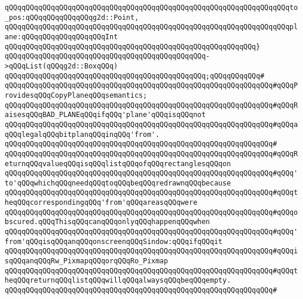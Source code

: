 \verb|qQQqqQQqqQQqqQQqqQQqqQQqqQQqqQQqqQQqqQQqqQQqqQQqqQQqqQQqqQQqqQQqqQQqto_pos:qQQqqQQqqQQqqQQqg2d::Point,|\newline
\verb|qQQqqQQqqQQqqQQqqQQqqQQqqQQqqQQqqQQqqQQqqQQqqQQqqQQqqQQqqQQqqQQqqQQqplane:qQQqqQQqqQQqqQQqqQQqInt|\newline
\verb|qQQqqQQqqQQqqQQqqQQqqQQqqQQqqQQqqQQqqQQqqQQqqQQqqQQqqQQqqQQq}|\newline
\verb|qQQqqQQqqQQqqQQqqQQqqQQqqQQqqQQqqQQqqQQqqQQqqQQq->qQQqList(qQQqg2d::BoxqQQq)|\newline
\verb|qQQqqQQqqQQqqQQqqQQqqQQqqQQqqQQqqQQqqQQqqQQqqQQq;qQQqqQQqqQQq#|\newline
\verb|qQQqqQQqqQQqqQQqqQQqqQQqqQQqqQQqqQQqqQQqqQQqqQQqqQQqqQQqqQQqqQQq#qQQqProvidesqQQqCopyPlaneqQQqsemantics;|\newline
\verb|qQQqqQQqqQQqqQQqqQQqqQQqqQQqqQQqqQQqqQQqqQQqqQQqqQQqqQQqqQQqqQQq#qQQqRaisesqQQqBAD_PLANEqQQqifqQQq'plane'qQQqisqQQqnot|\newline
\verb|qQQqqQQqqQQqqQQqqQQqqQQqqQQqqQQqqQQqqQQqqQQqqQQqqQQqqQQqqQQqqQQq#qQQqaqQQqlegalqQQqbitplanqQQqinqQQq'from'.|\newline
\verb|qQQqqQQqqQQqqQQqqQQqqQQqqQQqqQQqqQQqqQQqqQQqqQQqqQQqqQQqqQQqqQQq#|\newline
\verb|qQQqqQQqqQQqqQQqqQQqqQQqqQQqqQQqqQQqqQQqqQQqqQQqqQQqqQQqqQQqqQQq#qQQqReturnqQQqvalueqQQqisqQQqlistqQQqofqQQqrectanglesqQQqon|\newline
\verb|qQQqqQQqqQQqqQQqqQQqqQQqqQQqqQQqqQQqqQQqqQQqqQQqqQQqqQQqqQQqqQQq#qQQq'to'qQQqwhichqQQqneedqQQqtoqQQqbeqQQqredrawnqQQqbecause|\newline
\verb|qQQqqQQqqQQqqQQqqQQqqQQqqQQqqQQqqQQqqQQqqQQqqQQqqQQqqQQqqQQqqQQq#qQQqtheqQQqcorrespondingqQQq'from'qQQqareasqQQqwere|\newline
\verb|qQQqqQQqqQQqqQQqqQQqqQQqqQQqqQQqqQQqqQQqqQQqqQQqqQQqqQQqqQQqqQQq#qQQqobscured.qQQqThisqQQqcanqQQqonlyqQQqhappenqQQqwhen|\newline
\verb|qQQqqQQqqQQqqQQqqQQqqQQqqQQqqQQqqQQqqQQqqQQqqQQqqQQqqQQqqQQqqQQq#qQQq'from'qQQqisqQQqanqQQqonscreenqQQqSindow:qQQqifqQQqit|\newline
\verb|qQQqqQQqqQQqqQQqqQQqqQQqqQQqqQQqqQQqqQQqqQQqqQQqqQQqqQQqqQQqqQQq#qQQqisqQQqanqQQqRw_PixmapqQQqorqQQqRo_Pixmap|\newline
\verb|qQQqqQQqqQQqqQQqqQQqqQQqqQQqqQQqqQQqqQQqqQQqqQQqqQQqqQQqqQQqqQQq#qQQqtheqQQqreturnqQQqlistqQQqwillqQQqalwaysqQQqbeqQQqempty.|\newline
\verb|qQQqqQQqqQQqqQQqqQQqqQQqqQQqqQQqqQQqqQQqqQQqqQQqqQQqqQQqqQQqqQQq#|\newline
